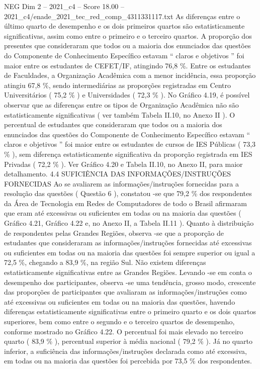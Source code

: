 \begin{textsample}{NEG Dim 2 – 2021\_c4 – Score 18.00 – 2021\_c4/enade\_2021\_tec\_red\_comp\_4311331117.txt}
As diferenças entre o último quarto de desempenho e os dois primeiros quartos são estatisticamente significativas, assim como entre o primeiro e o terceiro quartos.
A proporção dos presentes que consideraram que todos ou a maioria dos enunciados das questões do Componente de Conhecimento Específico estavam “ claros e objetivos ” foi maior entre os estudantes de CEFET/IF, atingindo 76,8 \%.
Entre os estudantes de Faculdades, a Organização Acadêmica com a menor incidência, essa proporção atingiu 67,8 \%, sendo intermediárias as proporções registradas em Centro Universitários ( 75,2 \% ) e Universidades ( 72,3 \% ).
No Gráfico 4.19, é possível observar que as diferenças entre os tipos de Organização Acadêmica não são estatisticamente significativas ( ver também Tabela II.10, no Anexo II ).
O percentual de estudantes que consideraram que todos ou a maioria dos enunciados das questões do Componente de Conhecimento Específico estavam “ claros e objetivos ” foi maior entre os estudantes de cursos de IES Públicas ( 73,3 \% ), sem diferença estatisticamente significativa da proporção registrada em IES Privadas ( 72,2 \% ).
Ver Gráfico 4.20 e Tabela II.10, no Anexo II, para maior detalhamento. 4.4 SUFICIÊNCIA DAS INFORMAÇÕES/INSTRUÇÕES FORNECIDAS Ao se avaliarem as informações/instruções fornecidas para a resolução das questões ( Questão 6 ), constatou -se que 79,2 \% dos respondentes da Área de Tecnologia em Redes de Computadores de todo o Brasil afirmaram que eram até excessivas ou suficientes em todas ou na maioria das questões ( Gráfico 4.21, Gráfico 4.22 e, no Anexo II, a Tabela II.11 ).
Quanto à distribuição de respondentes pelas Grandes Regiões, observa -se que a proporção de estudantes que consideraram as informações/instruções fornecidas até excessivas ou suficientes em todas ou na maioria das questões foi sempre superior ou igual a 72,5 \%, chegando a 83,9 \%, na região Sul.
Não existem diferenças estatisticamente significativas entre as Grandes Regiões.
Levando -se em conta o desempenho dos participantes, observa -se uma tendência, grosso modo, crescente das proporções de participantes que avaliaram as informações/instruções como até excessivas ou suficientes em todas ou na maioria das questões, havendo diferenças estatisticamente significativas entre o primeiro quarto e os dois quartos superiores, bem como entre o segundo e o terceiro quartos de desempenho, conforme mostrado no Gráfico 4.22.
O percentual foi mais elevado no terceiro quarto ( 83,9 \% ), percentual superior à média nacional ( 79,2 \% ).
Já no quarto inferior, a suficiência das informações/instruções declarada como até excessiva, em todas ou na maioria das questões foi percebida por 73,5 \% dos respondentes.

\end{textsample}
